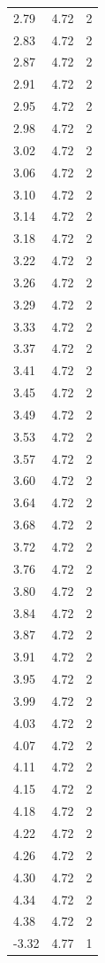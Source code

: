 \begin{longtable}{lrr}
  2.79 & 4.72 & 2 \\
  2.83 & 4.72 & 2 \\
  2.87 & 4.72 & 2 \\
  2.91 & 4.72 & 2 \\
  2.95 & 4.72 & 2 \\
  2.98 & 4.72 & 2 \\
  3.02 & 4.72 & 2 \\
  3.06 & 4.72 & 2 \\
  3.10 & 4.72 & 2 \\
  3.14 & 4.72 & 2 \\
  3.18 & 4.72 & 2 \\
  3.22 & 4.72 & 2 \\
  3.26 & 4.72 & 2 \\
  3.29 & 4.72 & 2 \\
  3.33 & 4.72 & 2 \\
  3.37 & 4.72 & 2 \\
  3.41 & 4.72 & 2 \\
  3.45 & 4.72 & 2 \\
  3.49 & 4.72 & 2 \\
  3.53 & 4.72 & 2 \\
  3.57 & 4.72 & 2 \\
  3.60 & 4.72 & 2 \\
  3.64 & 4.72 & 2 \\
  3.68 & 4.72 & 2 \\
  3.72 & 4.72 & 2 \\
  3.76 & 4.72 & 2 \\
  3.80 & 4.72 & 2 \\
  3.84 & 4.72 & 2 \\
  3.87 & 4.72 & 2 \\
  3.91 & 4.72 & 2 \\
  3.95 & 4.72 & 2 \\
  3.99 & 4.72 & 2 \\
  4.03 & 4.72 & 2 \\
  4.07 & 4.72 & 2 \\
  4.11 & 4.72 & 2 \\
  4.15 & 4.72 & 2 \\
  4.18 & 4.72 & 2 \\
  4.22 & 4.72 & 2 \\
  4.26 & 4.72 & 2 \\
  4.30 & 4.72 & 2 \\
  4.34 & 4.72 & 2 \\
  4.38 & 4.72 & 2 \\
  -3.32 & 4.77 & 1 \\

\end{longtable}
